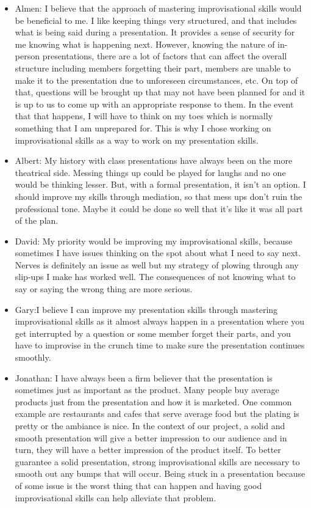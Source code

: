 \documentclass[12pt,letterpaper]{article}
\begin{document}
\begin{itemize}
    \item Almen: I believe that the approach of mastering improvisational skills would be beneficial to me. I like keeping things very structured, and that includes what is being said during a presentation. It provides a sense of security for me knowing what is happening next. However, knowing the nature of in-person presentations, there are a lot of factors that can affect the overall structure including members forgetting their part, members are unable to make it to the presentation due to unforeseen circumstances, etc. On top of that, questions will be brought up that may not have been planned for and it is up to us to come up with an appropriate response to them. In the event that that happens, I will have to think on my toes which is normally something that I am unprepared for. This is why I chose working on improvisational skills as a way to work on my presentation skills.
    \item Albert: My history with class presentations have always been on the more theatrical side. Messing things up could be played for laughs and no one would be thinking lesser. But, with a formal presentation, it isn't an option. I should improve my skills through mediation, so that mess ups don't ruin the professional tone. Maybe it could be done so well that it's like it was all part of the plan.
    \item David: My priority would be improving my improvisational skills, because sometimes I have issues thinking on the spot about what I need to say next. Nerves is definitely an issue as well but my strategy of plowing through any slip-ups I make has worked well. The consequences of not knowing what to say or saying the wrong thing are more serious.
    \item Gary:I believe I can improve my presentation skills through mastering improvisational skills as it almost always happen in a presentation where you get interrupted by a question or some member forget their parts, and you have to improvise in the crunch time to make sure the presentation continues smoothly.
    \item Jonathan: I have always been a firm believer that the presentation is sometimes just as important as the product. Many people buy average products just from the presentation and how it is marketed. One common example are restaurants and cafes that serve average food but the plating is pretty or the ambiance is nice. In the context of our project, a solid and smooth presentation will give a better impression to our audience and in turn, they will have a better impression of the product itself. To better guarantee a solid presentation, strong improvisational skills are necessary to smooth out any bumps that will occur. Being stuck in a presentation because of some issue is the worst thing that can happen and having good improvisational skills can help alleviate that problem.

\end{itemize}
\end{document}
